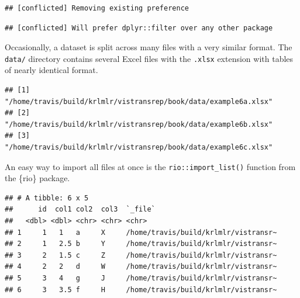 \documentclass[]{book}
\newenvironment{Shaded}{}{}
\newcommand{\DataTypeTok}[1]{#1}
\newcommand{\KeywordTok}[1]{\textcolor[rgb]{0.00,0.00,1.00}{#1}}
\newcommand{\NormalTok}[1]{#1}
\newcommand{\OperatorTok}[1]{#1}
\newcommand{\OtherTok}[1]{\textcolor[rgb]{1.00,0.25,0.00}{#1}}
\newcommand{\StringTok}[1]{\textcolor[rgb]{0.00,0.50,0.50}{#1}}
\begin{document}
\begin{verbatim}
## [conflicted] Removing existing preference
\end{verbatim}

\begin{verbatim}
## [conflicted] Will prefer dplyr::filter over any other package
\end{verbatim}

Occasionally, a dataset is split across many files with a very similar format.
The \texttt{data/} directory contains several Excel files with the \texttt{.xlsx} extension with tables of nearly identical format.

\begin{Shaded}
\end{Shaded}

\begin{verbatim}
## [1] "/home/travis/build/krlmlr/vistransrep/book/data/example6a.xlsx"
## [2] "/home/travis/build/krlmlr/vistransrep/book/data/example6b.xlsx"
## [3] "/home/travis/build/krlmlr/vistransrep/book/data/example6c.xlsx"
\end{verbatim}

An easy way to import all files at once is the \texttt{rio::import\_list()} function from the \{rio\} package.

\begin{Shaded}
\end{Shaded}

\begin{verbatim}
## # A tibble: 6 x 5
##      id  col1 col2  col3  `_file`                             
##   <dbl> <dbl> <chr> <chr> <chr>                               
## 1     1   1   a     X     /home/travis/build/krlmlr/vistransr~
## 2     1   2.5 b     Y     /home/travis/build/krlmlr/vistransr~
## 3     2   1.5 c     Z     /home/travis/build/krlmlr/vistransr~
## 4     2   2   d     W     /home/travis/build/krlmlr/vistransr~
## 5     3   4   g     J     /home/travis/build/krlmlr/vistransr~
## 6     3   3.5 f     H     /home/travis/build/krlmlr/vistransr~
\end{verbatim}
\end{document}

